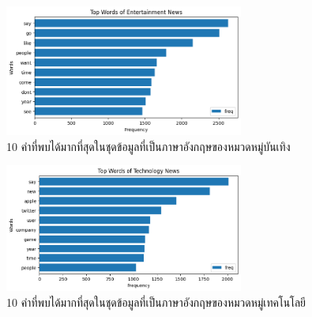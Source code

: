 \documentclass[12pt,oneside,openright,a4paper]{cpe-thai-project}
\begin{document}
        \newpage
        \begin{figure}[!ht]\centering
          \includegraphics[width=0.7\textwidth]{./img/eng_stat/ent_bar.png}
          \caption{10 คำที่พบได้มากที่สุดในชุดข้อมูลที่เป็นภาษาอังกฤษของหมวดหมู่บันเทิง}\label{fig:ent_bar_eng}
        \end{figure}
        \begin{figure}[!ht]\centering
          \includegraphics[width=0.7\textwidth]{./img/eng_stat/tech_bar.png}
          \caption{10 คำที่พบได้มากที่สุดในชุดข้อมูลที่เป็นภาษาอังกฤษของหมวดหมู่เทคโนโลยี}\label{fig:tech_bar_eng}
        \end{figure}
    
\end{document}
